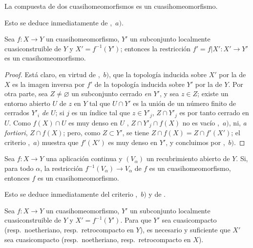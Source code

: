\begin{corollary}[10.2.3]
\label{IV.10.2.3}
La compuesta de dos cuasihomeomorfismos es un cuasihomeomorfismo.
\end{corollary}

Esto se deduce inmediatamente de ,~$a)$.

\begin{corollary}[10.2.4]
\label{IV.10.2.4}
Sea $f:X\to Y$ un cuasihomeomorfismo, $Y'$ un subconjunto localmente cuasiconstruible de $Y$ y $X'=f^{-1}(Y')$; entonces la restricción $f'=f|X':X'\to Y'$ es un cuasihomeomorfismo.
\end{corollary}

\begin{proof}
Está claro, en virtud de ,~$b)$, que la topología inducida sobre $X'$ por la de $X$ es la imagen inversa por $f'$ de la topología inducida sobre $Y'$ por la de $Y$.
Por otra parte,
sea $Z\neq\varnothing$ un subconjunto cerrado \emph{en} $Y'$, y sea $z\in Z$; existe un entorno abierto $U$ de $z$ en $Y$ tal que $U\cap Y'$ es la unión de un número finito de cerrados $Y'_i$ \emph{de} $U$; si $j$ es un índice tal que $z\in Y'_j$, $Z\cap Y'_j$ es por tanto cerrado en $U$.
Como $f(X)\cap U$ es muy denso en $U$ , $Z\cap Y'_j\cap f(X)$ no es vacío ,~$a)$, ni, \emph{a fortiori}, $Z\cap f(X)$; pero, como $Z\subset Y'$, se tiene $Z\cap f(X)=Z\cap f'(X')$; el criterio ,~$a)$ muestra que $f'(X')$ es muy denso en $Y'$, y concluimos por ,~$b)$.
\end{proof}

\begin{corollary}[10.2.5]
\label{IV.10.2.5}
Sea $f:X\to Y$ una aplicación continua y $(V_\alpha)$ un recubrimiento abierto de $Y$.
Si, para todo $\alpha$, la restricción $f^{-1}(V_\alpha)\to V_\alpha$ de $f$ es un cuasihomeomorfismo, entonces $f$ es un cuasihomeomorfismo.
\end{corollary}

Esto se deduce inmediatamente del criterio ,~$b)$ y de .

\begin{corollary}[10.2.6]
\label{IV.10.2.6}
Sea $f:X\to Y$ un cuasihomeomorfismo, $Y'$ un subconjunto localmente cuasiconstruible de $Y$ y $X'=f^{-1}(Y')$.
Para que $Y'$ sea cuasicompacto (\textup{resp.}\ noetheriano, \textup{resp.}\ retrocompacto en $Y$), es necesario y suficiente que $X'$ sea cuasicompacto (\textup{resp.}\ noetheriano, \textup{resp.}\ retrocompacto en $X$).
\end{corollary}

